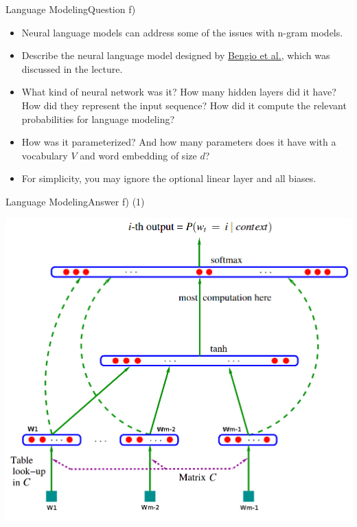 \documentclass[t]{beamer}
\begin{document}
\begin{frame}{Language Modeling}{Question f)}
    \begin{itemize}
        \item Neural language models can address some of the issues with n-gram
              models.
        \item Describe the neural language model designed by
              \href{https://www.jmlr.org/papers/volume3/bengio03a/bengio03a.pdf}{\underline{Bengio et al.}},
              which was discussed in the lecture.
        \item What kind of neural network was it? How many hidden layers did it
              have? How did they represent the input sequence? How did it compute
              the relevant probabilities for language modeling?
        \item How was it parameterized? And how many parameters does it have with a
              vocabulary $V$ and word embedding of size $d$?
        \item For simplicity, you may ignore the optional linear layer and all
              biases.
    \end{itemize}
\end{frame}

\begin{frame}{Language Modeling}{Answer f) (1)}
    \begin{center}
        \includegraphics[scale=0.25]{img/bengio_2.png}
    \end{center}
\end{frame}
\end{document}
